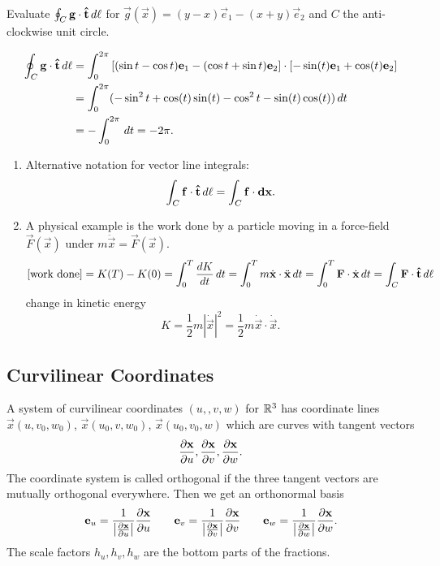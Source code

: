 \documentclass[10pt, a4paper]{article}
\begin{document}
\begin{example}
    Evaluate $\oint_{C}\vec{g}\cdot\hvec{t}\,d\ell$ for $\vec{g}(\vec{x}) = (y - x)\vec{e}_1 - (x + y)\vec{e}_2$ and $C$ the anti-clockwise unit circle.

    \begin{solution}
        \begin{align*}
            \oint_{C}\vec{g}\cdot\hvec{t}\,d\ell &= \int_{0}^{2\pi}\left[(\sin{t} - \cos{t})\vec{e}_1 - (\cos{t} + \sin{t})\vec{e}_2\right] \cdot \left[-\sin(t)\vec{e}_1 + \cos(t)\vec{e}_2\right] \\
            &= \int_{0}^{2\pi}(-\sin ^ 2{t} + \cos(t)\sin(t) - \cos ^ 2{t} - \sin(t)\cos(t))\,dt \\
            &= -\int_{0}^{2\pi}\,dt = -2\pi.
        \end{align*}
    \end{solution}
\end{example}

\begin{remark}
    \begin{enumerate}[label = (\roman*)]
        \item Alternative notation for vector line integrals:
        \[
        \int_{C}\vec{f}\cdot\hvec{t}\,d\ell = \int_{C}\vec{f}\cdot\vec{dx}.
        \]

        \item A physical example is the work done by a particle moving in a force-field $\vec{F}(\vec{x})$ under $m\ddot{\vec{x}} = \vec{F}(\vec{x})$.
        \[
        [\text{work done}] = K(T) - K(0) = \int_{0}^{T}\frac{dK}{dt}\,dt = \int_{0}^{T}m\dot{\vec{x}}\cdot\ddot{\vec{x}}\,dt = \int_{0}^{T}\vec{F}\cdot\dot{\vec{x}}\,dt = \int_{C}\vec{F}\cdot\hvec{t}\,d\ell
        \]
        change in kinetic energy
        \[
        K = \frac{1}{2}m|\dot{\vec{x}}| ^ 2 = \frac{1}{2}m\dot{\vec{x}}\cdot\dot{\vec{x}}.
        \]
    \end{enumerate}
\end{remark}

\subsection{Curvilinear Coordinates}
A system of curvilinear coordinates $(u,, v, w)$ for $\R ^ 3$ has coordinate lines $\vec{x}(u, v_0, w_0)$,
$\vec{x}(u_0, v, w_0)$,
$\vec{x}(u_0, v_0, w)$
which are curves with tangent vectors
\[
\pd[\vec{x}]{u}, \pd[\vec{x}]{v}, \pd[\vec{x}]{w}.
\]
The coordinate system is called orthogonal if the three tangent vectors are mutually orthogonal everywhere.
Then we get an orthonormal basis
\[
\vec{e}_u = \frac{1}{\left|\pd[\vec{x}]{u}\right|}\pd[\vec{x}]{u}\qquad\vec{e}_v = \frac{1}{\left|\pd[\vec{x}]{v}\right|}\pd[\vec{x}]{v}\qquad\vec{e}_w = \frac{1}{\left|\pd[\vec{x}]{w}\right|}\pd[\vec{x}]{w}.
\]
The scale factors $h_u, h_v, h_w$ are the bottom parts of the fractions.
\end{document}
